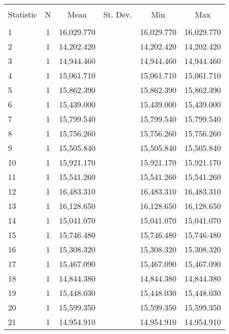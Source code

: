 
\begin{table}[!htbp] \centering 
  \caption{} 
  \label{} 
\begin{tabular}{@{\extracolsep{5pt}}lccccc} 
\\[-1.8ex]\hline 
\hline \\[-1.8ex] 
Statistic & \multicolumn{1}{c}{N} & \multicolumn{1}{c}{Mean} & \multicolumn{1}{c}{St. Dev.} & \multicolumn{1}{c}{Min} & \multicolumn{1}{c}{Max} \\ 
\hline \\[-1.8ex] 
1 & 1 & 16,029.770 &  & 16,029.770 & 16,029.770 \\ 
2 & 1 & 14,202.420 &  & 14,202.420 & 14,202.420 \\ 
3 & 1 & 14,944.460 &  & 14,944.460 & 14,944.460 \\ 
4 & 1 & 15,061.710 &  & 15,061.710 & 15,061.710 \\ 
5 & 1 & 15,862.390 &  & 15,862.390 & 15,862.390 \\ 
6 & 1 & 15,439.000 &  & 15,439.000 & 15,439.000 \\ 
7 & 1 & 15,799.540 &  & 15,799.540 & 15,799.540 \\ 
8 & 1 & 15,756.260 &  & 15,756.260 & 15,756.260 \\ 
9 & 1 & 15,505.840 &  & 15,505.840 & 15,505.840 \\ 
10 & 1 & 15,921.170 &  & 15,921.170 & 15,921.170 \\ 
11 & 1 & 15,541.260 &  & 15,541.260 & 15,541.260 \\ 
12 & 1 & 16,483.310 &  & 16,483.310 & 16,483.310 \\ 
13 & 1 & 16,128.650 &  & 16,128.650 & 16,128.650 \\ 
14 & 1 & 15,041.070 &  & 15,041.070 & 15,041.070 \\ 
15 & 1 & 15,746.480 &  & 15,746.480 & 15,746.480 \\ 
16 & 1 & 15,308.320 &  & 15,308.320 & 15,308.320 \\ 
17 & 1 & 15,467.090 &  & 15,467.090 & 15,467.090 \\ 
18 & 1 & 14,844.380 &  & 14,844.380 & 14,844.380 \\ 
19 & 1 & 15,448.030 &  & 15,448.030 & 15,448.030 \\ 
20 & 1 & 15,599.350 &  & 15,599.350 & 15,599.350 \\ 
21 & 1 & 14,954.910 &  & 14,954.910 & 14,954.910 \\ 

\end{tabular}
\end{table}

